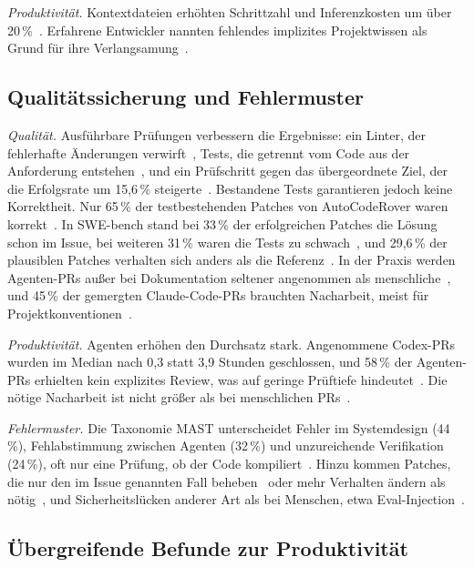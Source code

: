 \textit{Produktivität.} Kontextdateien erhöhten Schrittzahl und Inferenzkosten um über 20\,\%~\cite{gloaguen2026agentsmd}. Erfahrene Entwickler nannten fehlendes implizites Projektwissen als Grund für ihre Verlangsamung~\cite{becker2025metr}.

\subsection{Qualitätssicherung und Fehlermuster}
\label{sec:ergebnisse-qs}

\textit{Qualität.} Ausführbare Prüfungen verbessern die Ergebnisse: ein Linter, der fehlerhafte Änderungen verwirft~\cite{yang2024sweagent}, Tests, die getrennt vom Code aus der Anforderung entstehen~\cite{huang2023agentcoder}, und ein Prüfschritt gegen das übergeordnete Ziel, der die Erfolgsrate um 15,6\,\% steigerte~\cite{cemri2025mast}. Bestandene Tests garantieren jedoch keine Korrektheit. Nur 65\,\% der testbestehenden Patches von AutoCodeRover waren korrekt~\cite{zhang2024autocoderover}. In SWE-bench stand bei 33\,\% der erfolgreichen Patches die Lösung schon im Issue, bei weiteren 31\,\% waren die Tests zu schwach~\cite{aleithan2024swebenchplus}, und 29,6\,\% der plausiblen Patches verhalten sich anders als die Referenz~\cite{wang2026solvedissues}. In der Praxis werden Agenten-PRs außer bei Dokumentation seltener angenommen als menschliche~\cite{li2025aidev}, und 45\,\% der gemergten Claude-Code-PRs brauchten Nacharbeit, meist für Projektkonventionen~\cite{watanabe2025agenticprs}.

\textit{Produktivität.} Agenten erhöhen den Durchsatz stark. Angenommene Codex-PRs wurden im Median nach 0,3 statt 3,9 Stunden geschlossen, und 58\,\% der Agenten-PRs erhielten kein explizites Review, was auf geringe Prüftiefe hindeutet~\cite{li2025aidev}. Die nötige Nacharbeit ist nicht größer als bei menschlichen PRs~\cite{watanabe2025agenticprs}.

\textit{Fehlermuster.} Die Taxonomie MAST unterscheidet Fehler im Systemdesign (44\,\%), Fehlabstimmung zwischen Agenten (32\,\%) und unzureichende Verifikation (24\,\%), oft nur eine Prüfung, ob der Code kompiliert~\cite{cemri2025mast}. Hinzu kommen Patches, die nur den im Issue genannten Fall beheben~\cite{zhang2024autocoderover} oder mehr Verhalten ändern als nötig~\cite{wang2026solvedissues}, und Sicherheitslücken anderer Art als bei Menschen, etwa Eval-Injection~\cite{sajadi2025patchsecurity}.

\subsection{Übergreifende Befunde zur Produktivität}
\label{sec:ergebnisse-produktivitaet}

